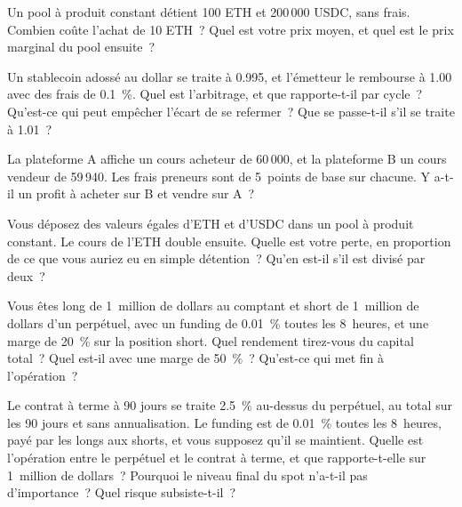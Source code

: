 \begin{question}\label{iq:iv2:crypto-for-traders-and-researchers:5}
Un pool à produit constant détient 100 ETH et 200\,000 USDC, sans frais. Combien coûte l'achat de 10 ETH~? Quel est votre prix moyen, et quel est le prix marginal du pool ensuite~?
\end{question}

\begin{question}\label{iq:iv2:crypto-for-traders-and-researchers:6}
Un stablecoin adossé au dollar se traite à 0.995, et l'émetteur le rembourse à 1.00 avec des frais de 0.1~\%. Quel est l'arbitrage, et que rapporte-t-il par cycle~? Qu'est-ce qui peut empêcher l'écart de se refermer~? Que se passe-t-il s'il se traite à 1.01~?
\end{question}

\begin{question}\label{iq:iv2:crypto-for-traders-and-researchers:7}
La plateforme A affiche un cours acheteur de 60\,000, et la plateforme B un cours vendeur de 59\,940. Les frais preneurs sont de 5~points de base sur chacune. Y a-t-il un profit à acheter sur B et vendre sur A~?
\end{question}

\begin{question}\label{iq:iv2:crypto-for-traders-and-researchers:8}
Vous déposez des valeurs égales d'ETH et d'USDC dans un pool à produit constant. Le cours de l'ETH double ensuite. Quelle est votre perte, en proportion de ce que vous auriez eu en simple détention~? Qu'en est-il s'il est divisé par deux~?
\end{question}

\begin{question}\label{iq:iv2:crypto-for-traders-and-researchers:9}
Vous êtes long de 1~million de dollars au comptant et short de 1~million de dollars d'un perpétuel, avec un funding de 0.01~\% toutes les 8~heures, et une marge de 20~\% sur la position short. Quel rendement tirez-vous du capital total~? Quel est-il avec une marge de 50~\%~? Qu'est-ce qui met fin à l'opération~?
\end{question}

\begin{question}\label{iq:iv2:crypto-for-traders-and-researchers:10}
Le contrat à terme à 90 jours se traite 2.5~\% au-dessus du perpétuel, au total sur les 90 jours et sans annualisation. Le funding est de 0.01~\% toutes les 8~heures, payé par les longs aux shorts, et vous supposez qu'il se maintient. Quelle est l'opération entre le perpétuel et le contrat à terme, et que rapporte-t-elle sur 1~million de dollars~? Pourquoi le niveau final du spot n'a-t-il pas d'importance~? Quel risque subsiste-t-il~?
\end{question}

